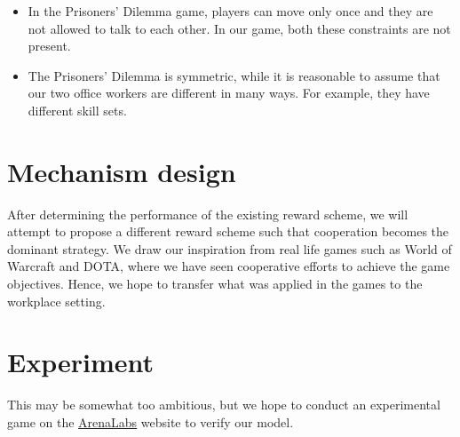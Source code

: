 \documentclass[11pt, a4paper]{article}
\begin{document}
	\begin{itemize}
		\item In the Prisoners' Dilemma game, players can move only once and they are not allowed to talk to each other. In our game, both these constraints are not present.
		\item The Prisoners' Dilemma is symmetric, while it is reasonable to assume that our two office workers are different in many ways. For example, they have different skill sets.		
	\end{itemize}
	
	\section{Mechanism design}
	After determining the performance of the existing reward scheme, we will attempt to propose a different reward scheme such that cooperation becomes the dominant strategy. We draw our inspiration from real life games such as World of Warcraft and DOTA, where we have seen cooperative efforts to achieve the game objectives. Hence, we hope to transfer what was applied in the games to the workplace setting.
	
	\section{Experiment}
	This may be somewhat too ambitious, but we hope to conduct an experimental game on the \href{http://arenalabs.co/}{ArenaLabs} website to verify our model.
	
\end{document}
